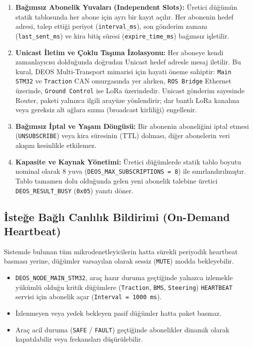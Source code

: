 \documentclass[a4paper,10pt]{article}
\newcommand{\hex}[1]{\texttt{0x#1}}
\newcommand{\code}[1]{\texttt{#1}}
\begin{document}
\begin{enumerate}
    \item \textbf{Bağımsız Abonelik Yuvaları (Independent Slots):}
    Üretici düğümün statik tablosunda her abone için ayrı bir kayıt açılır. Her abonenin hedef adresi, talep ettiği periyot (\code{interval\_ms}), son gönderim zamanı (\code{last\_sent\_ms}) ve kira bitiş süresi (\code{expire\_time\_ms}) bağımsız işletilir.
    
    \item \textbf{Unicast İletim ve Çoklu Taşıma İzolasyonu:}
    Her aboneye kendi zamanlayıcısı dolduğunda doğrudan Unicast hedef adresle mesaj iletilir. Bu kural, DEOS Multi-Transport mimarisi için hayati öneme sahiptir: \code{Main STM32} ve \code{Traction} CAN omurgasında yer alırken, \code{ROS Bridge} Ethernet üzerinde, \code{Ground Control} ise LoRa üzerindedir. Unicast gönderim sayesinde Router, paketi yalnızca ilgili arayüze yönlendirir; dar bantlı LoRa kanalına veya gereksiz alt ağlara sızma (broadcast kirliliği) engellenir.
    
    \item \textbf{Bağımsız İptal ve Yaşam Döngüsü:}
    Bir abonenin aboneliğini iptal etmesi (\code{UNSUBSCRIBE}) veya kira süresinin (TTL) dolması, diğer abonelerin veri akışını kesinlikle etkilemez.
    
    \item \textbf{Kapasite ve Kaynak Yönetimi:}
    Üretici düğümlerde statik tablo boyutu nominal olarak 8 yuva (\code{DEOS\_MAX\_SUBSCRIPTIONS = 8}) ile sınırlandırılmıştır. Tablo tamamen dolu olduğunda gelen yeni abonelik talebine üretici \code{DEOS\_RESULT\_BUSY} (\hex{05}) yanıtı döner.
\end{enumerate}

\subsection{İsteğe Bağlı Canlılık Bildirimi (On-Demand Heartbeat)}

Sistemde bulunan tüm mikrodenetleyicilerin hatta sürekli periyodik heartbeat basması yerine, düğümler varsayılan olarak sessiz (\code{MUTE}) modda bekleyebilir.

\begin{itemize}
    \item \code{DEOS\_NODE\_MAIN\_STM32}, araç hazır duruma geçtiğinde yalnızca izlemekle yükümlü olduğu kritik düğümlere (\code{Traction}, \code{BMS}, \code{Steering}) \code{HEARTBEAT} servisi için abonelik açar (\code{Interval = 1000 ms}).
    \item İzlenmeyen veya yedek bekleyen pasif düğümler hatta paket basmaz.
    \item Araç acil duruma (\code{SAFE} / \code{FAULT}) geçtiğinde abonelikler dinamik olarak kapatılabilir veya frekansları düşürülebilir.
\end{itemize}
\end{document}
